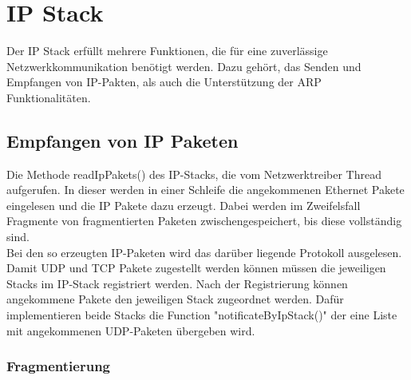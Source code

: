 \section{IP Stack}
Der IP Stack erfüllt mehrere Funktionen, die für eine zuverlässige Netzwerkkommunikation benötigt werden. Dazu gehört, das Senden und Empfangen von IP-Pakten, als auch die Unterstützung der ARP Funktionalitäten.

\subsection{Empfangen von IP Paketen}

Die Methode readIpPakets() des IP-Stacks, die vom Netzwerktreiber Thread aufgerufen. In dieser werden in einer Schleife die angekommenen Ethernet Pakete eingelesen und die IP Pakete dazu erzeugt. Dabei werden im Zweifelsfall Fragmente von fragmentierten Paketen zwischengespeichert, bis diese vollständig sind. \\
Bei den so erzeugten IP-Paketen wird das darüber liegende Protokoll ausgelesen.\\
Damit UDP und TCP Pakete zugestellt werden können müssen die jeweiligen Stacks im IP-Stack registriert werden. Nach der Registrierung können angekommene  Pakete den jeweiligen Stack zugeordnet werden. Dafür implementieren beide Stacks die Function "notificateByIpStack()" der eine Liste mit angekommenen UDP-Paketen übergeben wird. 

\subsubsection{Fragmentierung}

